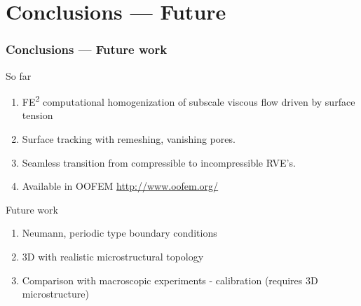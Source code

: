 \documentclass[11pt]{beamer} %
\begin{document}

\section{Conclusions --- Future}
\begin{frame}
 \frametitle{Conclusions --- Future work}
 So far
 \begin{enumerate}
  \item FE\textsuperscript{2} computational homogenization of subscale viscous flow driven by surface tension
  \item Surface tracking with remeshing, vanishing pores.
  \item Seamless transition from compressible to incompressible RVE's.
  \item Available in OOFEM \url{http://www.oofem.org/}
 \end{enumerate}

 Future work
 \begin{enumerate}
  \item Neumann, periodic type boundary conditions
  \item 3D with realistic microstructural topology
  \item Comparison with macroscopic experiments - calibration (requires 3D microstructure)
 \end{enumerate}

\end{frame}

\end{document}
